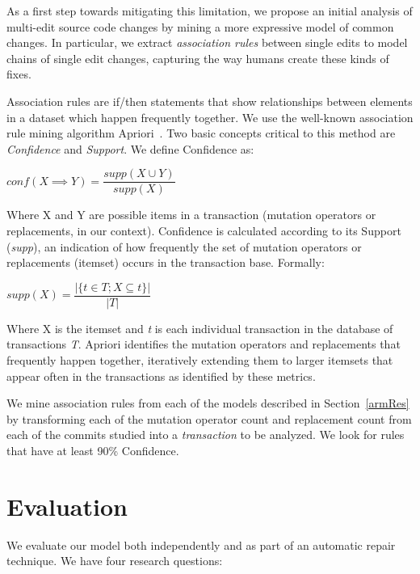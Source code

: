 \documentclass[conference]{IEEEtran}
\begin{document}
As a first step towards mitigating this limitation, we propose 
an initial analysis of multi-edit 
source code changes by mining a more expressive model of common changes. In
particular, we extract \emph{association rules} between single edits 
to model chains of single edit changes, capturing the way humans create these kinds of fixes.

Association rules are if/then statements that show relationships between elements in a dataset which happen frequently together. We use the 
well-known association rule mining algorithm
Apriori~\cite{Agrawal94}. 
%
Two basic concepts critical to this method are \emph{Confidence} and \emph{Support}.
We define Confidence as:

\begin{center}
$conf(X \implies Y) = \dfrac{supp(X \cup Y)}{supp(X)}$ 
\end{center}

Where X and Y are possible items in a transaction (mutation operators or replacements, in our
context). Confidence is calculated according to its Support (\emph{supp}), 
an indication of how frequently the set of mutation operators or replacements (itemset) 
 occurs in the transaction base.
Formally:

\begin{center}
$supp(X) = \dfrac{|\{t \in T; X \subseteq t\}|}{|T|}$
\end{center}

Where X is the itemset and \emph{t} is each individual transaction in
the database of transactions \emph{T}. Apriori identifies the mutation
operators and replacements that frequently happen together, iteratively extending them to larger
itemsets that appear often in the transactions as identified by these metrics.

We mine association rules from each of the models described in Section~\ref{armRes} by transforming each of the mutation operator count and replacement count from 
each of the commits studied into a \emph{transaction} to be analyzed. 
We look for rules that have at least 90\% Confidence.


\section{Evaluation} \label{evaluation}

We evaluate our model both independently and as part of an automatic repair
technique.  We have four research questions:
\end{document}
